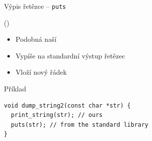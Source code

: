 \begin{frame}[fragile]{Výpis řetězce -- \texttt{puts}}

   ()
  \begin{itemize}
    \item Podobná naší 

    \pause

    \item Vypíše na standardní výstup řetězec 

    \pause

    \item Vloží nový řádek
  \end{itemize}

\begin{block}{Příklad}
\begin{lstlisting}
void dump_string2(const char *str) {
  print_string(str); // ours
  puts(str); // from the standard library
}
\end{lstlisting}
\end{block}

\end{frame}

